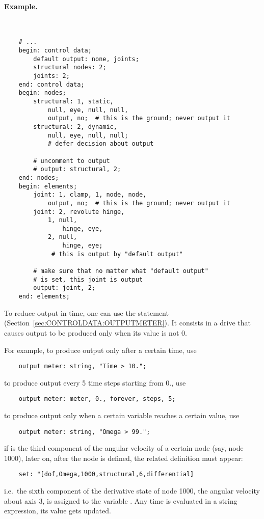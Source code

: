\paragraph{Example.} \
\begin{verbatim}
    # ...
    begin: control data;
        default output: none, joints;
        structural nodes: 2;
        joints: 2;
    end: control data;
    begin: nodes;
        structural: 1, static,
            null, eye, null, null,
            output, no;  # this is the ground; never output it
        structural: 2, dynamic,
            null, eye, null, null;
            # defer decision about output

        # uncomment to output
        # output: structural, 2;
    end: nodes;
    begin: elements;
        joint: 1, clamp, 1, node, node,
            output, no;  # this is the ground; never output it
        joint: 2, revolute hinge,
            1, null,
                hinge, eye,
            2, null,
                hinge, eye;
             # this is output by "default output"

        # make sure that no matter what "default output"
        # is set, this joint is output
        output: joint, 2;
    end: elements;
\end{verbatim}

To reduce output in time, one can use the  statement
(Section~\ref{sec:CONTROLDATA:OUTPUTMETER}).
It consists in a drive that causes output to be produced only when 
its value is not 0.

For example, to produce output only after a certain time, use
\begin{verbatim}
    output meter: string, "Time > 10.";
\end{verbatim}
to produce output every 5 time steps starting from 0., use
\begin{verbatim}
    output meter: meter, 0., forever, steps, 5;
\end{verbatim}
to produce output only when a certain variable reaches a certain value, use
\begin{verbatim}
    output meter: string, "Omega > 99.";
\end{verbatim}
if  is the third component of the angular velocity 
of a certain node (say, node 1000), later on, after the node is defined, 
the related definition must appear:
\begin{verbatim}
    set: "[dof,Omega,1000,structural,6,differential]
\end{verbatim}
i.e.\ the sixth component of the derivative state of node 1000,
the angular velocity about axis 3, is assigned to the variable .
Any time \kw{Omega} is evaluated in a string expression, its value
gets updated.




